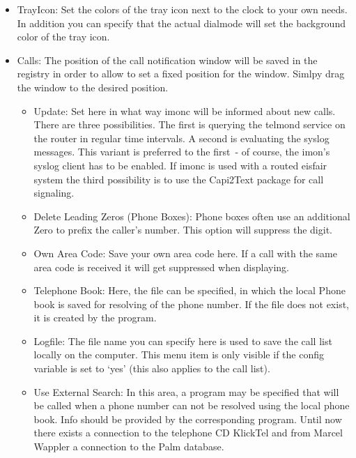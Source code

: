 \begin{itemize}
  \item TrayIcon:
  	Set the colors of the tray icon next to the clock to your own needs.
  	In addition you can specify that the actual dialmode will set the background
  	color of the tray icon.

  \item Calls: The position of the call notification window will be saved in the
    registry in order to allow to set a fixed position for the window. Simlpy drag the
    window to the desired position.
    \begin{itemize}
      \item Update: Set here in what way imonc will be informed about new calls. There
	are three possibilities. The first is querying the telmond service on the
	router in regular time intervals. A second is evaluating the syslog messages.
	This variant is preferred to the first~- of course, the imon's syslog client
	has to be enabled. If imonc is used with a routed eisfair system the third
	possibility is to use the Capi2Text package for call signaling.
      \item Delete Leading Zeros (Phone Boxes): Phone boxes often use an additional
	Zero to prefix the caller's number. This option will suppress the digit.
      \item Own Area Code: Save your own area code here. If a call with the same
	area code is received it will get suppressed when displaying.
      \item Telephone Book: Here, the file can be specified, in which the local
        Phone book is saved for resolving of the phone number. If the file does not
        exist, it is created by the program.
      \item Logfile: The file name you can specify here is used to save the call
	list locally on the computer. This menu item is only visible if the config
	variable  is set to `yes' (this also applies to the
        call list).
      \item Use External Search: In this area, a program may be specified that will
	be called when a phone number can not be resolved using the local phone book.
	Info should be provided by the corresponding program. Until now there exists
	a connection to the telephone CD KlickTel and from Marcel Wappler a connection
	to the Palm database.
    \end{itemize}


\end{itemize}
